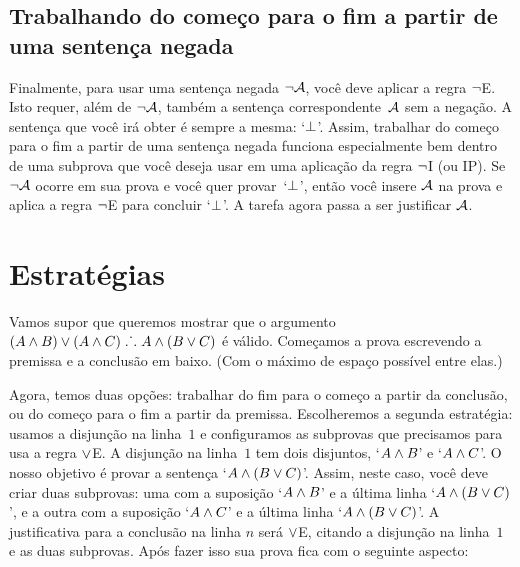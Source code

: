 \subsection*{ Trabalhando do começo para o fim a partir de uma sentença negada}

Finalmente, para usar uma sentença negada $\neg \mathcal{A}$, você deve aplicar a regra $\neg$E. Isto requer, além de  $\neg \mathcal{A}$,  também a sentença correspondente~$\mathcal{A}$ sem a negação. A sentença que você irá obter é sempre a mesma: `$\bot$'. Assim, trabalhar do começo para o fim a partir de uma sentença negada funciona especialmente bem dentro de uma subprova que você deseja usar em uma aplicação da regra $\neg$I (ou IP).  Se $\neg \mathcal{A}$ ocorre em sua prova e você quer provar~`$\bot$', então você insere $\mathcal{A}$ na prova e aplica a regra $\neg$E para concluir `$\bot$'. A tarefa agora passa a ser justificar $\mathcal{A}$.

\begin{fitchproof}
	\ellipsesline 
\end{fitchproof}


\section{Estratégias }

Vamos supor que queremos mostrar que o argumento $(A \wedge B) \vee (A \wedge C) \mathrel{\ldotp\dot{}\,\ldotp} A \wedge (B \vee C)$ é válido. Começamos a prova escrevendo a premissa e a conclusão em baixo. (Com o máximo de espaço possível entre elas.) 
\begin{fitchproof}
\ellipsesline
\end{fitchproof}
Agora, temos duas opções: trabalhar do fim para o começo a partir da conclusão, ou do começo para o fim a partir da premissa. Escolheremos a segunda estratégia: usamos a disjunção na linha~$1$ e configuramos as subprovas que precisamos para usa a regra $\vee$E. A disjunção na linha~$1$ tem dois disjuntos, `$A \wedge B$' e `$A \wedge C$'.  O nosso objetivo é provar a sentença `$A \wedge (B \vee C)$'. Assim, neste caso, você  deve criar duas subprovas:  uma com a suposição `$A \wedge B$' e a última linha `$A \wedge (B \vee C)$', e a  outra com a suposição `$A \wedge C$' e a última linha `$A \wedge (B \vee C)$'. A justificativa para a conclusão na linha $n$  será  $\vee$E,  citando a disjunção na linha~$1$ e as duas subprovas. Após fazer isso sua prova fica com o seguinte aspecto:
 

